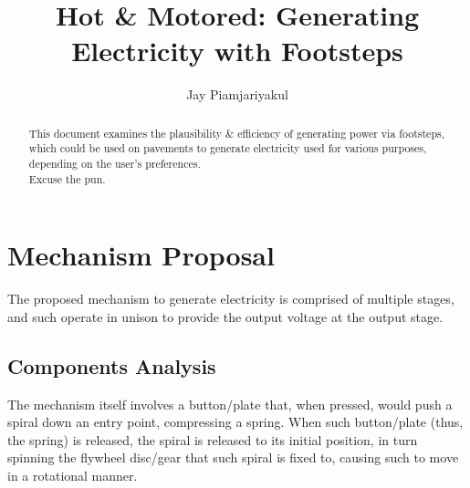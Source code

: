 \documentclass[conference]{IEEEtran}
\author[1]{Jay Piamjariyakul}
\affil[1]{Undergraduate, Department of Electrical \& Electronic Engineering, University of Bristol}
\title{Hot \& Motored: Generating Electricity with Footsteps}
\begin{document}
\maketitle
\begin{abstract}
This document examines the plausibility \& efficiency of generating power via footsteps, which could be used on pavements to generate electricity used for various purposes, depending on the user's preferences.
\\
Excuse the pun.
\end{abstract}

 

\section{Mechanism Proposal}
The proposed mechanism to generate electricity is comprised of multiple stages, and such operate in unison to provide the output voltage at the output stage.

\subsection{Components Analysis}
The mechanism itself involves a button/plate that, when pressed, would push a spiral down an entry point, compressing a spring. When such button/plate (thus, the spring) is released, the spiral is released to its initial position, in turn spinning the flywheel disc/gear that such spiral is fixed to, causing such to move in a rotational manner.
\end{document}
